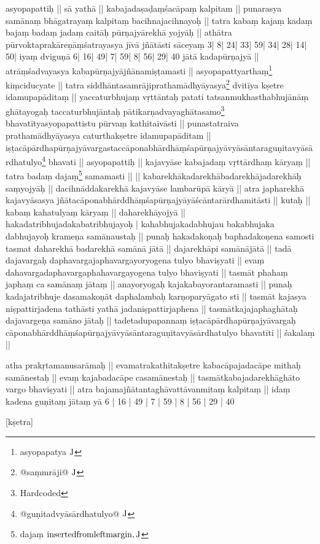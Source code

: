 \documentclass[10pt]{article}
\begin{document}
asyopapattiḥ || sā yathā || 
kabajadaṣaḍaṃśacāpaṃ kalpitam || 
punarasya samānaṃ bhāgatrayaṃ kalpitaṃ bacihnajacihnayoḥ || 
tatra  kabaṃ kajaṃ kadaṃ bajaṃ badaṃ jadaṃ caitāḥ 
pūrṇajyārekhā yojyāḥ || 
athātra  pūrvoktaprakāreṇāṃśatrayasya jīvā jñātāsti sāceyaṃ 
3| 8| 24| 33| 59| 34| 28| 14| 50| iyaṃ dviguṇā 
6| 16| 49| 7| 59| 8| 56| 29| 40 jātā kadapūrṇajyā || 
atrāṃśadvayasya kabapūrṇajyājñānamiṣṭamasti || 
asyopapattyarthaṃ\footnote{asyopapatya ${\rm J}$} 
kiṃciducyate  || 
tatra 
siddhāntasamrājiprathamādhyāyasya\footnote{@saṃmrāji@ ${\rm J}$}
dvitīya kṣetre idamupapāditaṃ || 
yaccaturbhujaṃ vṛttāntaḥ patati tatsanmukhasthabhujānāṃ ghātayogaḥ
taccaturbhujāntaḥ 
pātikarṇadvayaghātasamo\footnote{Hardcoded}%
bhavatītyasyopapattistu pūrvaṃ kathitaivāsti || 
punastatraiva prathamādhyāyasya  caturthakṣetre idamupapāditam || 
iṣṭacāpārdha\-pūrṇajyā\-vargastaccāpona\-bhārdhāṃśapūrṇa\-jyāvyāsāntaraguṇitavyāsārdha\-tulyo\footnote{@guṇitadvyāsārdhatulyo@ ${\rm J}$}
bhavati || 
asyopapattiḥ || 
kajavyāse kabajadaṃ vṛttārdhaṃ kāryaṃ || 
tatra badaṃ dajaṃ\footnote{dajaṃ ${\rm inserted from left margin, J}$}
samamasti   ||  || 
kabarekhākadarekhābadarekhājadarekhāḥ saṃyojyāḥ  || 
dacihnāddakarekhā kajavyāse lambarūpā kāryā || 
atra  japharekhā kajavyāsasya jñātacāponabhārddhāṃśapūrṇajyāyāścāntarārdhamitāsti || 
kutaḥ || 
kabaṃ  kahatulyaṃ kāryaṃ || 
daharekhāyojyā || 
hakadatribhujadakabatribhujayoḥ | 
kaha\-bhuja\-kada\-bhu\-jau bakabhujaka%
dabhujayoḥ 
krameṇa samānaustaḥ || punaḥ hakadakoṇaḥ bapha\-dakoṇena samosti tasmat daharekhā badarekhā samānā jātā || dajarekhāpi samānājātā || tadā dajavargaḥ daphavargajaphavargayoryogena tulyo bhaviṣyati || 
 evaṃ dahavargadaphavargaphahavargayogena tulyo bhaviṣyati || 
 tasmāt phahaṃ japhaṃ ca samānaṃ jātaṃ || anayoryogaḥ kajakabayorantaramasti || punaḥ kadajatribhuje dasamakoṇāt daphalambaḥ karṇoparyāgato sti || 
 tasmāt kajasya niṣpattirjadena tathāsti 
 yathā jadaniṣpattirjaphena || tasmātkajajaphaghātaḥ dajavargeṇa samāno jātaḥ || 
 tadetadupapannaṃ iṣṭacāpārdhapūrṇajyāvargaḥ cāponabhārddhāṃśapūrṇajyāvyāsāntaraguṇitavyāsārdhatulyo bhavatīti || 
 śakalaṃ || 
 
 atha prakṛtamanusarāmaḥ || 
 evamatrakathitakṣetre kabacāpajadacāpe mithaḥ samānestaḥ || 
 evaṃ kajabadacāpe casamānestaḥ || tasmātkabajadarekhāghāto vargo bhaviṣyati || 
atra bajamajñātantaghāvattāvanmitaṃ kalpitaṃ || idaṃ kadena guṇitaṃ jātaṃ yā 
6 |  16 | 49 | 7 | 59 | 8 | 56 | 29 | 40
 
 [kṣetra]
 
\end{document}
